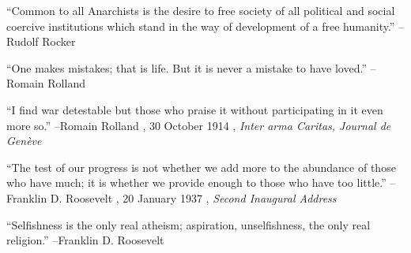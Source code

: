 \documentclass{article}%
\begin{document}
\begin{minipage}{\textwidth}%
\flushleft%
“Common to all Anarchists is the desire to free society of all political and social coercive institutions which stand in the way of development of a free humanity.”%
\linebreak%
\vspace{1mm}%
–Rudolf Rocker%
\linebreak%
\vspace{1mm}%
\end{minipage}%
\linebreak%
\vspace{1mm}%
\begin{minipage}{\textwidth}%
\flushleft%
“One makes mistakes; that is life. But it is never a mistake to have loved.”%
\linebreak%
\vspace{1mm}%
–Romain Rolland%
\linebreak%
\vspace{1mm}%
\end{minipage}%
\linebreak%
\vspace{1mm}%
\begin{minipage}{\textwidth}%
\flushleft%
“I find war detestable but those who praise it without participating in it even more so.”%
\linebreak%
\vspace{1mm}%
–Romain Rolland%
, 30 October 1914%
, \textit{Inter arma Caritas, Journal de Genève}%
\linebreak%
\vspace{1mm}%
\end{minipage}%
\linebreak%
\vspace{1mm}%
\begin{minipage}{\textwidth}%
\flushleft%
“The test of our progress is not whether we add more to the abundance of those who have much; it is whether we provide enough to those who have too little.”%
\linebreak%
\vspace{1mm}%
–Franklin D. Roosevelt%
, 20 January 1937%
, \textit{Second Inaugural Address}%
\linebreak%
\vspace{1mm}%
\end{minipage}%
\linebreak%
\vspace{1mm}%
\begin{minipage}{\textwidth}%
\flushleft%
“Selfishness is the only real atheism; aspiration, unselfishness, the only real religion.”%
\linebreak%
\vspace{1mm}%
–Franklin D. Roosevelt%
\linebreak%
\vspace{1mm}%
\end{minipage}%
\end{document}
